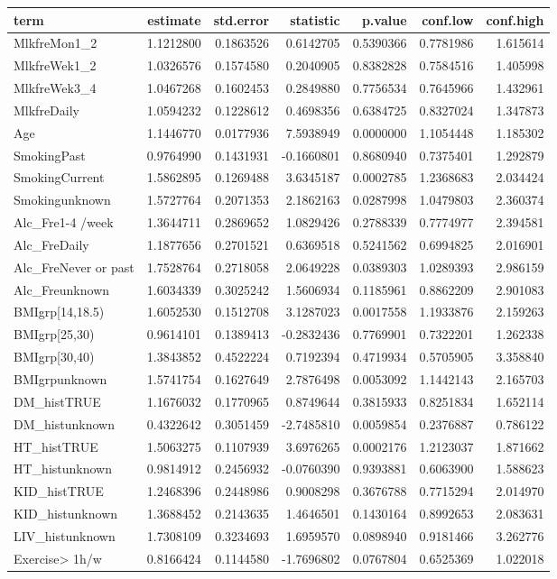 \documentclass[]{article}
\begin{document}
\begin{longtable}[]{@{}lrrrrrr@{}}
\toprule
term & estimate & std.error & statistic & p.value & conf.low &
conf.high\tabularnewline
\midrule
\endhead
MlkfreMon1\_2 & 1.1212800 & 0.1863526 & 0.6142705 & 0.5390366 &
0.7781986 & 1.615614\tabularnewline
MlkfreWek1\_2 & 1.0326576 & 0.1574580 & 0.2040905 & 0.8382828 &
0.7584516 & 1.405998\tabularnewline
MlkfreWek3\_4 & 1.0467268 & 0.1602453 & 0.2849880 & 0.7756534 &
0.7645966 & 1.432961\tabularnewline
MlkfreDaily & 1.0594232 & 0.1228612 & 0.4698356 & 0.6384725 & 0.8327024
& 1.347873\tabularnewline
Age & 1.1446770 & 0.0177936 & 7.5938949 & 0.0000000 & 1.1054448 &
1.185302\tabularnewline
SmokingPast & 0.9764990 & 0.1431931 & -0.1660801 & 0.8680940 & 0.7375401
& 1.292879\tabularnewline
SmokingCurrent & 1.5862895 & 0.1269488 & 3.6345187 & 0.0002785 &
1.2368683 & 2.034424\tabularnewline
Smokingunknown & 1.5727764 & 0.2071353 & 2.1862163 & 0.0287998 &
1.0479803 & 2.360374\tabularnewline
Alc\_Fre1-4 /week & 1.3644711 & 0.2869652 & 1.0829426 & 0.2788339 &
0.7774977 & 2.394581\tabularnewline
Alc\_FreDaily & 1.1877656 & 0.2701521 & 0.6369518 & 0.5241562 &
0.6994825 & 2.016901\tabularnewline
Alc\_FreNever or past & 1.7528764 & 0.2718058 & 2.0649228 & 0.0389303 &
1.0289393 & 2.986159\tabularnewline
Alc\_Freunknown & 1.6034339 & 0.3025242 & 1.5606934 & 0.1185961 &
0.8862209 & 2.901083\tabularnewline
BMIgrp{[}14,18.5) & 1.6052530 & 0.1512708 & 3.1287023 & 0.0017558 &
1.1933876 & 2.159263\tabularnewline
BMIgrp{[}25,30) & 0.9614101 & 0.1389413 & -0.2832436 & 0.7769901 &
0.7322201 & 1.262338\tabularnewline
BMIgrp{[}30,40) & 1.3843852 & 0.4522224 & 0.7192394 & 0.4719934 &
0.5705905 & 3.358840\tabularnewline
BMIgrpunknown & 1.5741754 & 0.1627649 & 2.7876498 & 0.0053092 &
1.1442143 & 2.165703\tabularnewline
DM\_histTRUE & 1.1676032 & 0.1770965 & 0.8749644 & 0.3815933 & 0.8251834
& 1.652114\tabularnewline
DM\_histunknown & 0.4322642 & 0.3051459 & -2.7485810 & 0.0059854 &
0.2376887 & 0.786122\tabularnewline
HT\_histTRUE & 1.5063275 & 0.1107939 & 3.6976265 & 0.0002176 & 1.2123037
& 1.871662\tabularnewline
HT\_histunknown & 0.9814912 & 0.2456932 & -0.0760390 & 0.9393881 &
0.6063900 & 1.588623\tabularnewline
KID\_histTRUE & 1.2468396 & 0.2448986 & 0.9008298 & 0.3676788 &
0.7715294 & 2.014970\tabularnewline
KID\_histunknown & 1.3688452 & 0.2143635 & 1.4646501 & 0.1430164 &
0.8992653 & 2.083631\tabularnewline
LIV\_histunknown & 1.7308109 & 0.3234693 & 1.6959570 & 0.0898940 &
0.9181466 & 3.262776\tabularnewline
Exercise\textgreater{} 1h/w & 0.8166424 & 0.1144580 & -1.7696802 &
0.0767804 & 0.6525369 & 1.022018\tabularnewline

\end{longtable}
\end{document}
